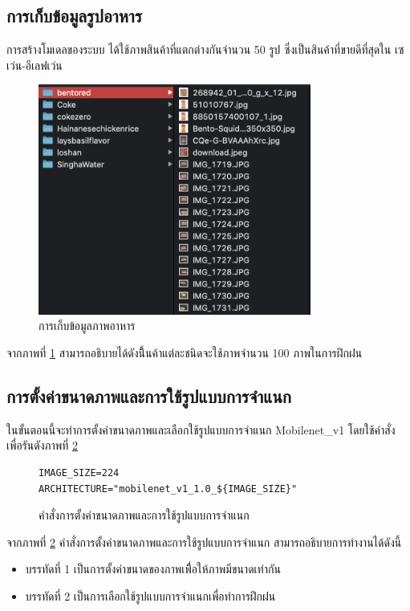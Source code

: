 \subsection{การเก็บข้อมูลรูปอาหาร}
การสร้างโมเดลของระบบ ได้ใช้ภาพสินค้าที่แตกต่างกันจำนวน 50 รูป ซึ่งเป็นสินค้าที่ขายดีที่สุดใน  เซเว่น-อีเลฟเว่น 
				\begin{figure}[H]
								\centering
								\includegraphics[width=0.8\textwidth]{Figures/3/ten/prepic.png}
								\caption{การเก็บข้อมูลภาพอาหาร}
								\label{Fig:picfood}
							\end{figure}
							จากภาพที่ \ref{Fig:picfood} สามารถอธิบายได้ดังนี้ินค้าแต่ละชนิดจะใช้ภาพจำนวน 100 ภาพในการฝึกฝน 
	

		\subsection{การตั้งค่าขนาดภาพและการใช้รูปแบบการจำแนก}
							ในขั้นตอนนี้จะทำการตั้งค่าขนาดภาพและเลือกใช้รูปแบบการจำแนก Mobilenet\_v1 โดยใช้คำสั่งเพื่อรันดังภาพที่ \ref{Fig:mobile}
			

\begin{figure}[H]
{\begin{lstlisting}
IMAGE_SIZE=224                  
ARCHITECTURE="mobilenet_v1_1.0_${IMAGE_SIZE}"
\end{lstlisting}}
\caption{คำสั่งการตั้งค่าขนาดภาพและการใช้รูปแบบการจำแนก}
\label{Fig:mobile}
\end{figure}
จากภาพที่ \ref{Fig:mobile} คำสั่งการตั้งค่าขนาดภาพและการใช้รูปแบบการจำแนก สามารถอธิบายการทำงานได้ดังนี้
\begin{itemize}[label={--}]
	\item บรรทัดที่  1	     เป็นการตั้งค่าขนาดของภาพเพื่ิอให้ภาพมีขนาดเท่ากัน
	\item บรรทัดที่  2 	     เป็นการเลือกใช้รูปแบบการจำแนกเพื่อทำการฝึกฝน  
\end{itemize}


